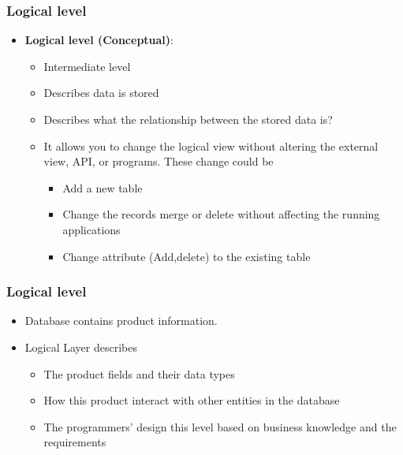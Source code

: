 \VideoClassification
\begin{frame}
	\frametitle{Logical level}
	\begin{itemize}[<+->]
		\item \textbf{Logical level (Conceptual)}: 
		\begin{itemize}[<+->]
			\item Intermediate level
			\item Describes \textbf{\underline{}} data is stored
			\item Describes what the relationship between the stored data is?
			\item It allows you to change the logical view without altering the external view, API, or programs. These change could be
			\begin{itemize}[<+->]
				\item Add a new table
				\item Change the records merge or delete without affecting the running applications
				\item Change attribute (Add,delete) to the existing table
			\end{itemize}									
		\end{itemize}		
	\end{itemize}	 
\end{frame}
\begin{frame}
	\frametitle{Logical level}
	\begin{example}
		\begin{itemize}[<+->]
			\item Database contains product information.
			\item Logical Layer describes
			\begin{itemize}[<+->]
				\item The product fields and their data types
				\item How this product interact with other entities in the database
				\item The programmers' design this level based on business knowledge and the requirements
			\end{itemize}
		\end{itemize}
	\end{example}
	
\end{frame}


